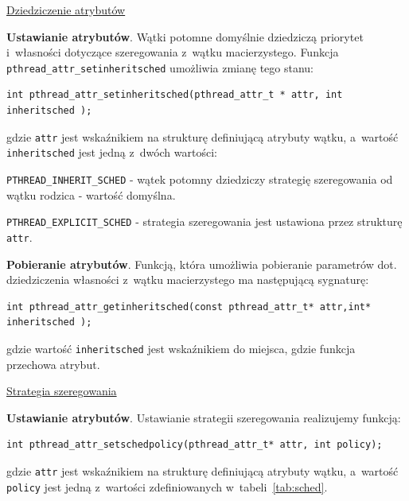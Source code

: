 \underline{Dziedziczenie atrybutów}


\noindent\textbf{Ustawianie atrybutów}. Wątki potomne domyślnie dziedziczą priorytet i~własności dotyczące szeregowania z~wątku macierzystego. Funkcja \lstinline[style=MyCStyle]{pthread_attr_setinheritsched} umożliwia zmianę tego stanu:

\begin{lstlisting}[style=MyCStyle]
int pthread_attr_setinheritsched(pthread_attr_t * attr, int inheritsched );
\end{lstlisting}

gdzie \lstinline[style=MyCStyle]{attr} jest wskaźnikiem na strukturę definiującą atrybuty wątku, a~wartość \lstinline[style=MyCStyle]{inheritsched} jest jedną z~dwóch wartości:

\begin{myitemize}
\item \lstinline[style=MyCStyle]{PTHREAD_INHERIT_SCHED} - wątek potomny dziedziczy strategię szeregowania od wątku rodzica - wartość domyślna.
\item \lstinline[style=MyCStyle]{PTHREAD_EXPLICIT_SCHED} - strategia szeregowania jest ustawiona przez strukturę \lstinline[style=MyCStyle]{attr}.
\end{myitemize}

\noindent\textbf{Pobieranie atrybutów}. Funkcją, która umożliwia pobieranie parametrów dot. dziedziczenia własności z~wątku macierzystego ma następującą sygnaturę:

\begin{lstlisting}[style=MyCStyle]
int pthread_attr_getinheritsched(const pthread_attr_t* attr,int* inheritsched );
\end{lstlisting}

gdzie wartość \lstinline[style=MyCStyle]{inheritsched} jest wskaźnikiem do miejsca, gdzie funkcja przechowa atrybut.

\noindent\underline{Strategia szeregowania}

\noindent\textbf{Ustawianie atrybutów}. Ustawianie strategii szeregowania realizujemy funkcją:

\begin{lstlisting}[style=MyCStyle]
int pthread_attr_setschedpolicy(pthread_attr_t* attr, int policy);
\end{lstlisting}

gdzie \lstinline[style=MyCStyle]{attr} jest wskaźnikiem na strukturę definiującą atrybuty wątku, a~wartość \lstinline[style=MyCStyle]{policy} jest jedną z~wartości zdefiniowanych w~tabeli~\ref{tab:sched}.

